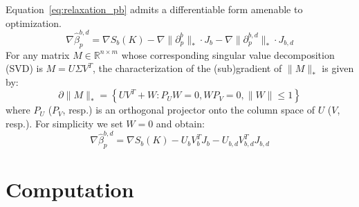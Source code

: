\documentclass[10pt]{article}
\DeclareMathOperator*{\argmin}{arg\,min}
\begin{document}
Equation~\eqref{eq:relaxation_pb} admits a differentiable form amenable to optimization. 
\begin{equation}
	\nabla \hat{\beta}_p^{b,d} = \nabla S_b(K) - \nabla \lVert \partial_p^b \rVert_{\ast} \cdot J_b - \nabla \lVert \partial_p^{b,d} \rVert_\ast \cdot J_{b,d}
\end{equation}
For any matrix $M \in \mathbb{R}^{n \times m}$ whose corresponding singular value decomposition (SVD) is $M = U \Sigma V^T $, the characterization of the (sub)gradient of $\lVert M \rVert_\ast$ is given by\cite{}: 
\begin{equation}
	\partial\|M\|_{*}=\left\{U V^T + W: P_{U} W=0, W P_{V}=0,\|W\| \leq 1\right\}
\end{equation}
where $P_U$ ($P_V$, resp.) is an orthogonal projector onto the column space of $U$ ($V$, resp.). For simplicity we set $W = 0$ and obtain: %
 \begin{equation}
	\nabla \hat{\beta}_p^{b,d} = \nabla S_b(K) - U_b V_b^T J_b - U_{b,d} V_{b,d}^T J_{b,d}
\end{equation}


\section{Computation}\label{sec:computation}
\end{document}
